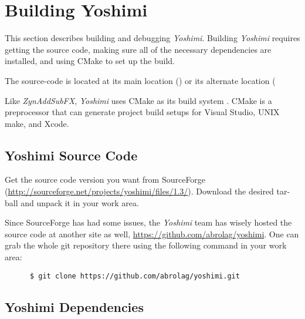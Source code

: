 %
%
%

\section{Building Yoshimi}
\label{sec:yoshimi_build}

   This section describes building and debugging \textsl{Yoshimi}.
   Building \textsl{Yoshimi} requires getting the source code, making sure
   all of the necessary dependencies are installed, and using CMake to set
   up the build.

   The source-code is located at its main location (\cite{yoshimi})
   or its alternate location (\cite{yoshimi2}

   Like \textsl{ZynAddSubFX}, \textsl{Yoshimi} uses CMake as its build
   system \cite{zyncmake}.  CMake is a preprocessor that can generate
   project build setups for Visual Studio, UNIX make, and Xcode.

\subsection{Yoshimi Source Code}
\label{sec:yoshimi_source_code}

   Get the source code version you want from SourceForge
   (\url{http://sourceforge.net/projects/yoshimi/files/1.3/}).
   Download the desired tar-ball and unpack it in your work area.

   Since SourceForge has had some issues, the \textsl{Yoshimi} team
   has wisely hosted the source code at another site as well,
   \url{https://github.com/abrolag/yoshimi}.  One can grab the whole
   git repository there using the following command in your work area:

   \begin{verbatim}
      $ git clone https://github.com/abrolag/yoshimi.git
   \end{verbatim}

\subsection{Yoshimi Dependencies}
\label{sec:yoshimi_dependencies}

